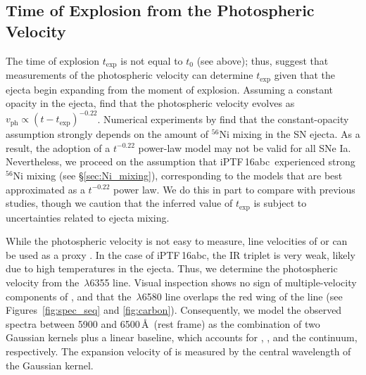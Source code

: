 \documentclass[twocolumn]{aastex61}
\newcommand{\abc}{iPTF\,16abc}
\begin{document}
\subsection{Time of Explosion from the Photospheric Velocity}
\label{sec:early_vel}

The time of explosion $t_\mathrm{exp}$ is not equal to $t_0$ (see above);
thus, \citet{2014ApJ...784...85P} suggest that measurements of the
photospheric velocity can determine $t_\mathrm{exp}$ given that the ejecta
begin expanding from the moment of explosion. Assuming a constant opacity in
the ejecta, \citeauthor{2014ApJ...784...85P} find that the photospheric
velocity evolves as $v_\mathrm{ph}\propto(t-t_\mathrm{exp})^{-0.22}$.
Numerical experiments by \citet{2016ApJ...826...96P} find that the
constant-opacity assumption strongly depends on the amount of $^{56}$Ni
mixing in the SN ejecta. As a result, the adoption of a $t^{-0.22}$
power-law model may not be valid for all SNe Ia. Nevertheless, we proceed on
the assumption that \abc\ experienced strong $^{56}$Ni mixing (see
\S\ref{sec:Ni_mixing}), corresponding to the models that are best
approximated as a $t^{-0.22}$ power law. We do this in part to compare with
previous studies, though we caution that the inferred value of
$t_\mathrm{exp}$ is subject to uncertainties related to ejecta mixing.

While the photospheric velocity is not easy to measure, line velocities of
 or  can be used as a proxy
\citep{2014ApJ...784...85P,2016ApJ...826..144S}. In the case of \abc, the
 IR triplet is very weak, likely due to high temperatures in the
ejecta. Thus, we determine the photospheric velocity from the
\,$\lambda$6355 line. Visual inspection shows no sign of
multiple-velocity components of , and that the
\,$\lambda$6580 line overlaps the red wing of the  line
(see Figures~\ref{fig:spec_seq} and \ref{fig:carbon}). Consequently, we model
the observed spectra between 5900 and 6500\,\AA\ (rest frame) as the
combination of two Gaussian kernels plus a linear baseline, which accounts for
, , and the continuum, respectively. The expansion
velocity of  is measured by the central wavelength of the
 Gaussian kernel.
\end{document}
